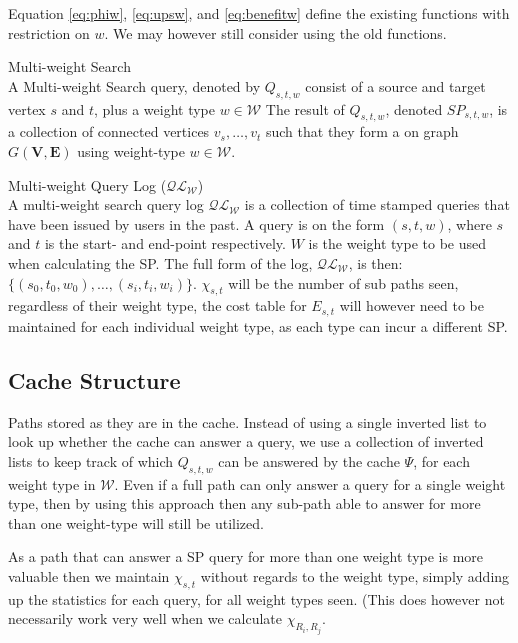 Equation \ref{eq:phiw}, \ref{eq:upsw}, and \ref{eq:benefitw} define the existing functions with restriction on $w$. We may however still consider using the old functions.

\begin{definition}{Multi-weight Search}\\
A Multi-weight Search query, denoted by $Q_{s,t,w}$ consist of a source and target vertex $s$ and $t$, plus a weight type $w \in \mathcal{W}$ 
The result of $Q_{s,t,w}$, denoted $SP_{s,t,w}$, is a collection of connected vertices $v_s,\dotsc,v_t$ such that they form a \spath on graph $G\mathbf{(V,E)}$ using weight-type $w \in \mathcal{W}$.
\end{definition}







\begin{definition}{Multi-weight Query Log ($\mathcal{QL_W}$)}\\
A multi-weight search query log $\mathcal{QL_W}$ is a collection of time stamped queries that have been issued by users in the past.
A query is on the form $(s,t,w)$, where $s$ and $t$ is the start- and end-point respectively. $W$ is the weight type to be used when calculating the SP. The full form of the log, $\mathcal{QL_W}$,  is then: $\{(s_0,t_0,w_0),\dots,(s_i,t_i,w_i)\}$. $\chi_{s,t}$ will be the number of sub paths seen, regardless of their weight type, the cost table for $E_{s,t}$ will however need to be maintained for each individual weight type, as each type can incur a different SP.
\end{definition}


\subsection{Cache Structure}

Paths stored as they are in the cache. Instead of using a single inverted list to look up whether the cache can answer a query, we use a collection of inverted lists to keep track of which $Q_{s,t,w}$ can be answered by the cache $\Psi$, for each weight type in $\mathcal{W}$.
Even if a full path can only answer a query for a single weight type, then by using this approach then any sub-path able to answer for more than one weight-type will still be utilized. 

As a path that can answer a SP query for more than one weight type is more valuable then we maintain $\chi_{s,t}$ without regards to the weight type, simply adding up the statistics for each query, for all weight types seen. (This does however not necessarily work very well when we calculate $\chi_{R_i,R_j}$. 

